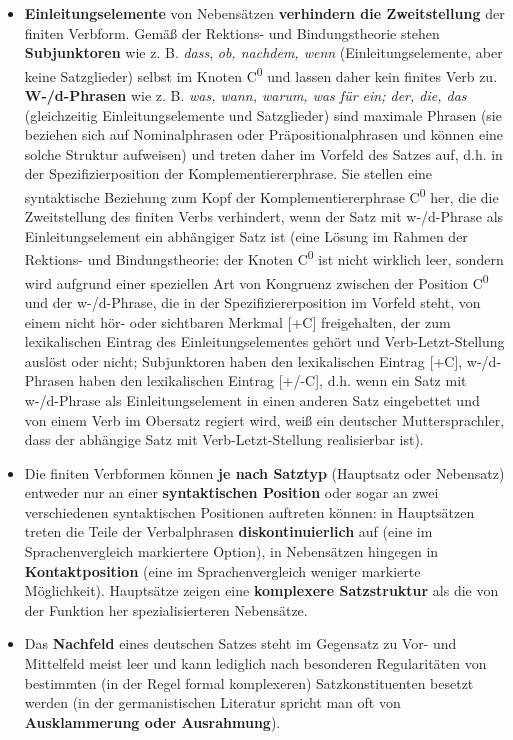 \begin{itemize}
\item
  \textbf{Einleitungselemente} von Nebensätzen \textbf{verhindern die
  Zweitstellung} der finiten Verbform. Gemäß der Rektions- und
  Bindungstheorie stehen \textbf{Subjunktoren} wie z. B. \emph{dass},
  \emph{ob, nachdem, wenn} (Einleitungselemente, aber keine Satzglieder)
  selbst im Knoten C\textsuperscript{0} und lassen daher kein finites
  Verb zu. \textbf{W-/d-Phrasen} wie z. B. \emph{was, wann, warum, was
  für ein; der, die, das} (gleichzeitig Einleitungselemente und
  Satzglieder) sind maximale Phrasen (sie beziehen sich auf
  Nominalphrasen oder Präpositionalphrasen und können eine solche
  Struktur aufweisen) und treten daher im Vorfeld des Satzes auf, d.h.
  in der Spezifizierposition der Komplementiererphrase. Sie stellen eine
  syntaktische Beziehung zum Kopf der Komplementiererphrase
  C\textsuperscript{0} her, die die Zweitstellung des finiten Verbs
  verhindert, wenn der Satz mit w-/d-Phrase als Einleitungselement ein
  abhängiger Satz ist (eine Lösung im Rahmen der Rektions- und
  Bindungstheorie: der Knoten C\textsuperscript{0} ist nicht wirklich
  leer, sondern wird aufgrund einer speziellen Art von Kongruenz
  zwischen der Position C\textsuperscript{0} und der w-/d-Phrase, die in
  der Spezifiziererposition im Vorfeld steht, von einem nicht hör- oder
  sichtbaren Merkmal {[}+C{]} freigehalten, der zum lexikalischen
  Eintrag des Einleitungselementes gehört und Verb-Letzt-Stellung
  auslöst oder nicht; Subjunktoren haben den lexikalischen Eintrag
  {[}+C{]}, w-/d-Phrasen haben den lexikalischen Eintrag {[}+/-C{]},
  d.h. wenn ein Satz mit w-/d-Phrase als Einleitungselement in einen
  anderen Satz eingebettet und von einem Verb im Obersatz regiert wird,
  weiß ein deutscher Muttersprachler, dass der abhängige Satz mit
  Verb-Letzt-Stellung realisierbar ist).
\end{itemize}

\begin{itemize}
\item
  Die finiten Verbformen können \textbf{je nach Satztyp} (Hauptsatz oder
  Nebensatz) entweder nur an einer \textbf{syntaktischen Position} oder
  sogar an zwei verschiedenen syntaktischen Positionen auftreten können:
  in Hauptsätzen treten die Teile der Verbalphrasen
  \textbf{diskontinuierlich} auf (eine im Sprachenvergleich markiertere
  Option), in Nebensätzen hingegen in \textbf{Kontaktposition} (eine im
  Sprachenvergleich weniger markierte Möglichkeit). Hauptsätze zeigen
  eine \textbf{komplexere Satzstruktur} als die von der Funktion her
  spezialisierteren Nebensätze.
\item
  Das \textbf{Nachfeld} eines deutschen Satzes steht im Gegensatz zu
  Vor- und Mittelfeld meist leer und kann lediglich nach besonderen
  Regularitäten von bestimmten (in der Regel formal komplexeren)
  Satzkonstituenten besetzt werden (in der germanistischen Literatur
  spricht man oft von \textbf{Ausklammerung oder Ausrahmung}).
\end{itemize}

